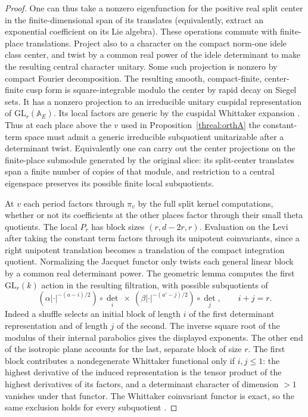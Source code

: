 \begin{proof}
One can thus take a nonzero eigenfunction for the positive real
split center in the finite-dimensional span of its translates
(equivalently, extract an exponential coefficient on its Lie
algebra). These operations commute with finite-place translations.
Project also to a character on the compact norm-one idele class
center, and twist by a common real power of the idele determinant
to make the resulting central character unitary. Some such projection
is nonzero by compact Fourier decomposition. The resulting smooth,
compact-finite, center-finite cusp form is square-integrable modulo
the center by rapid decay on Siegel sets. It has a nonzero projection
to an irreducible unitary cuspidal representation of
\(\mathrm{GL}_r(\mathbb A_E)\). Its local factors are generic by
the cuspidal Whittaker expansion \cite{shalikaGeneric}. Thus at
each place above the \(v\) used in Proposition~\ref{threal:orthA}
the constant-term space must admit a generic irreducible subquotient
unitarizable after a determinant twist. Equivalently one can carry
out the center projections on the finite-place submodule generated
by the original slice: its split-center translates span a finite
number of copies of that module, and restriction to a central
eigenspace preserves its possible finite local subquotients.

At \(v\) each period factors through \(\pi_v\) by the full split
kernel computations, whether or not its coefficients at the other
places factor through their small theta quotients. The local
\(P_r\) has block sizes \((r,d-2r,r)\). Evaluation on the Levi after
taking the constant term factors through its unipotent coinvariants,
since a right unipotent translation becomes a translation of the
compact integration quotient. Normalizing the Jacquet functor only
twists each general linear block by a common real determinant power.
The geometric lemma computes the first \(\mathrm{GL}_r(k)\) action
in the resulting filtration, with possible subquotients of
\[
 \left(\alpha|\cdot|^{-(a-i)/2}\right)\circ\det_i
       \ \times\
 \left(\beta|\cdot|^{-(a'-j)/2}\right)\circ\det_j,\qquad i+j=r .
\]
Indeed a shuffle selects an initial block of length \(i\) of the
first determinant representation and of length \(j\) of the
second. The inverse square root of the modulus of their internal
parabolics gives the displayed exponents. The other end of the
isotropic plane accounts for the last, separate block of size \(r\).
\cite[geometric lemma, \S2.12]{bzgLemma}
The first block contributes a nondegenerate Whittaker functional
only if \(i,j\le1\): the highest derivative of the induced
representation is the tensor product of the highest derivatives
of its factors, and a determinant character of dimension \(>1\)
vanishes under that functor. The Whittaker coinvariant functor is
exact, so the same exclusion holds for every subquotient
\cite[\S4]{bzgLemma}.


\end{proof}
